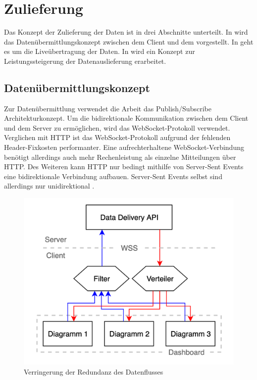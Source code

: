 \section{Zulieferung}
\label{sec:zulieferung}
Das Konzept der Zulieferung der Daten ist in drei Abschnitte
unterteilt. In  wird das Datenübermittlungskonzept
zwischen dem Client und dem  vorgestellt.
In  geht es um die Liveübertragung der Daten. In
 wird ein Konzept zur Leistungssteigerung der Datenauslieferung
erarbeitet.

\subsection{Datenübermittlungskonzept}
\label{subsec:datenuebermittlungskonzept}
Zur Datenübermittlung verwendet die Arbeit das Publish/Subscribe Architekturkonzept.
Um die bidirektionale Kommunikation zwischen dem Client und dem Server zu ermöglichen,
wird das WebSocket-Protokoll verwendet. Verglichen mit HTTP ist das WebSocket-Protokoll
aufgrund der fehlenden Header-Fixkosten performanter. Eine aufrechterhaltene WebSocket-Verbindung
benötigt allerdings auch mehr Rechenleistung als einzelne Mitteilungen über HTTP. Des Weiteren
kann HTTP nur bedingt mithilfe von Server-Sent Events eine bidirektionale Verbindung aufbauen.
Server-Sent Events selbst sind allerdings nur unidirektional \cite[2. Abschnitt]{WebSocketVSSSE}.

\begin{figure}
    \begin{center}
    \includegraphics[scale=0.2]{img/abbildungen/Verteilung}
    \end{center}
    \caption{Verringerung der Redundanz des Datenflusses}
    \label{figure:uebersichtderdatenauslieferung}
\end{figure}

